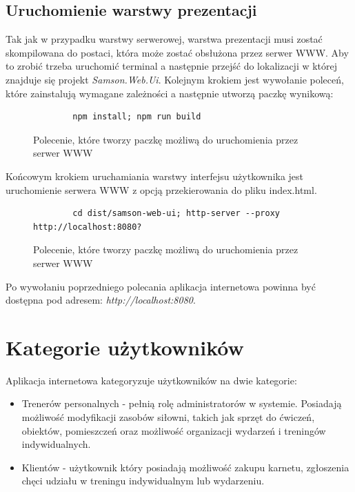 \documentclass[a4paper,twoside,12pt]{book}
\begin{document}
\subsection{Uruchomienie warstwy prezentacji}
Tak jak w przypadku warstwy serwerowej, warstwa prezentacji musi zostać skompilowana do postaci, która może zostać obsłużona przez serwer WWW. Aby to zrobić trzeba uruchomić terminal a następnie przejść do lokalizacji w której znajduje się projekt \textit{Samson.Web.Ui}. Kolejnym krokiem jest wywołanie poleceń, które zainstalują wymagane zależności a następnie utworzą paczkę wynikową:
\begin{figure} [H]
	\centering
	\begin{lstlisting}
		npm install; npm run build
	\end{lstlisting}
	\caption{Polecenie, które tworzy paczkę możliwą do uruchomienia przez serwer WWW}
	\label{fig:installAndBuildAngularProejct}
\end{figure}

Końcowym krokiem uruchamiania warstwy interfejsu użytkownika jest uruchomienie serwera WWW z opcją przekierowania do pliku index.html.
\begin{figure} [H]
	\centering
	\begin{lstlisting}
		cd dist/samson-web-ui; http-server --proxy http://localhost:8080?
	\end{lstlisting}
	\caption{Polecenie, które tworzy paczkę możliwą do uruchomienia przez serwer WWW}
	\label{fig:runWWWServer}
\end{figure}

Po wywołaniu poprzedniego polecania aplikacja internetowa powinna być dostępna pod adresem: \textit{http://localhost:8080}.

\section {Kategorie użytkowników}

Aplikacja internetowa kategoryzuje użytkowników na dwie kategorie:
\begin{itemize}
	\item Trenerów personalnych - pełnią rolę administratorów w systemie. Posiadają możliwość modyfikacji zasobów siłowni, takich jak sprzęt do ćwiczeń, obiektów, pomieszczeń oraz możliwość organizacji wydarzeń i treningów indywidualnych.
	\item Klientów - użytkownik który posiadają możliwość zakupu karnetu, zgłoszenia chęci udziału w treningu indywidualnym lub wydarzeniu.
\end{itemize}
\end{document}
